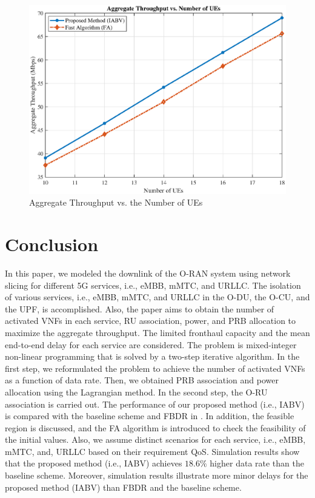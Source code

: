 \documentclass[conference]{IEEEtran}
\begin{document}
\begin{figure}
  \centering 
    \includegraphics[scale = 0.4]{FA.eps}
  \caption{Aggregate Throughput vs. the Number of UEs }
  \label{fig:14}
\end{figure}

\section{Conclusion}\label{conc}
In this  paper, we modeled the downlink of the O-RAN system using network slicing for different 5G services, i.e., eMBB, mMTC, and URLLC.
The isolation of various services, i.e., eMBB, mMTC, and URLLC in the O-DU, the O-CU, and the UPF, is accomplished.
Also, the paper aims to obtain the number of activated VNFs in each service, RU association, power, and PRB allocation to maximize the aggregate throughput. The limited fronthaul capacity and the mean end-to-end delay for each service are considered. 
The problem is mixed-integer non-linear programming that is solved by a two-step iterative algorithm.
In the first step, we reformulated the problem to achieve the number of activated VNFs as a function of data rate. Then, we obtained PRB association and power allocation using the Lagrangian method.
In the second step, the O-RU association is carried out.
The performance of our proposed method (i.e., IABV) is compared with the baseline scheme and FBDR in \cite{lee2018dynamic}. 
In addition, the feasible region is discussed, and the FA algorithm is introduced to check the feasibility of the initial values.
Also, we assume distinct scenarios for each service, i.e., eMBB, mMTC, and, URLLC based on their requirement QoS.
Simulation results show that the proposed method (i.e., IABV) achieves $18.6\%$ higher data rate than the baseline scheme.
Moreover, simulation results illustrate more minor delays for the proposed method (IABV) than FBDR and the baseline scheme.


 

\end{document}
